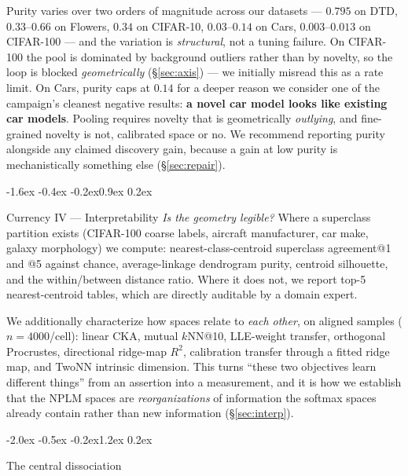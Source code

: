 \documentclass{article}
\makeatletter
\renewcommand\section{\@startsection{section}{1}{\z@}%
  {-2.0ex \@plus -0.5ex \@minus -0.2ex}{1.2ex \@plus 0.2ex}%
  {\large\bf\raggedright}}
\renewcommand\subsection{\@startsection{subsection}{2}{\z@}%
  {-1.6ex \@plus -0.4ex \@minus -0.2ex}{0.9ex \@plus 0.2ex}%
  {\normalsize\bf\raggedright}}
\makeatother
\begin{document}
Purity varies over two orders of magnitude across our datasets --- $0.795$ on
DTD, $0.33$--$0.66$ on Flowers, $0.34$ on CIFAR-10, $0.03$--$0.14$ on Cars,
$0.003$--$0.013$ on CIFAR-100 --- and the variation is \emph{structural}, not a
tuning failure. On CIFAR-100 the pool is dominated by background outliers
rather than by novelty, so the loop is blocked \emph{geometrically}
(\S\ref{sec:axis}) --- we initially misread this as a rate limit. On Cars,
purity caps at
$0.14$ for a deeper reason we consider one of the campaign's cleanest negative
results: \textbf{a novel car model looks like existing car models}. Pooling
requires novelty that is geometrically \emph{outlying}, and fine-grained
novelty is not, calibrated space or no. We recommend reporting purity
alongside any claimed discovery gain, because a gain at low purity is
mechanistically something else (\S\ref{sec:repair}).

\subsection{Currency IV --- Interpretability}
\emph{Is the geometry legible?} Where a superclass partition exists (CIFAR-100
coarse labels, aircraft manufacturer, car make, galaxy morphology) we compute:
nearest-class-centroid superclass agreement@1 and @5 against chance,
average-linkage dendrogram purity, centroid silhouette, and the
within/between distance ratio. Where it does not, we report top-5
nearest-centroid tables, which are directly auditable by a domain expert.

We additionally characterize how spaces relate to \emph{each other}, on aligned
samples ($n{=}4000$/cell): linear CKA, mutual $k$NN@10, LLE-weight transfer,
orthogonal Procrustes, directional ridge-map $R^2$, calibration transfer
through a fitted ridge map, and TwoNN intrinsic dimension. This turns
``these two objectives learn different things'' from an assertion into a
measurement, and it is how we establish that the NPLM spaces are
\emph{reorganizations} of information the softmax spaces already contain rather
than new information (\S\ref{sec:interp}).

\section{The central dissociation}
\label{sec:dissoc}
\end{document}
